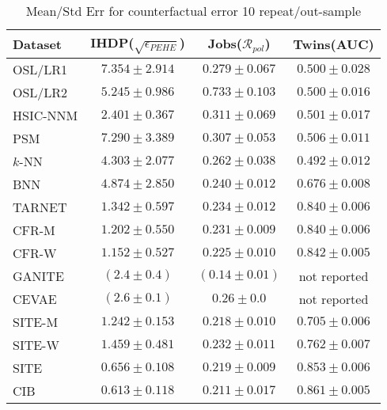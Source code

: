 \documentclass{article}
\begin{document}
\begin{table}[ht]
  \caption{Mean/Std Err for counterfactual error 10 repeat/out-sample}
  \label{metric-out_full}
  \centering
  \begin{tabular}{lccc}
    \toprule
    Dataset & IHDP($\sqrt{\epsilon_{PEHE}}$) & Jobs($\mathcal{R}_{pol}$) & Twins(AUC) \\
    \midrule
    OSL/LR1 & $7.354 \pm 2.914$ & $0.279 \pm 0.067$ & $0.500 \pm 0.028$ \\
    OSL/LR2 & $5.245 \pm 0.986$ & $0.733 \pm 0.103$ & $0.500 \pm 0.016$ \\
    \midrule
    HSIC-NNM & $2.401 \pm 0.367$ & $0.311 \pm 0.069$ & $0.501 \pm 0.017$ \\
    PSM & $7.290 \pm 3.389$ & $0.307 \pm 0.053$ & $0.506 \pm 0.011$ \\
    $k$-NN & $4.303 \pm 2.077$ & $0.262 \pm 0.038$ & $0.492 \pm 0.012$ \\
    \midrule
    BNN & $4.874 \pm 2.850$ & $\mathbf{0.240 \pm 0.012}$ & $0.676 \pm 0.008$ \\
    TARNET & $1.342 \pm 0.597$ & $\mathbf{0.234 \pm 0.012}$ & $0.840 \pm 0.006$ \\
    CFR-M & $1.202 \pm 0.550$ & $\mathbf{0.231 \pm 0.009}$ & $0.840 \pm 0.006$ \\
    CFR-W & $1.152 \pm 0.527$ & $\mathbf{0.225 \pm 0.010}$ & $0.842 \pm 0.005$ \\
    GANITE & $(2.4 \pm 0.4)$ & $({0.14 \pm 0.01})$ & not reported\\
    CEVAE & $(2.6 \pm 0.1)$ & $ 0.26 \pm 0.0$ & not reported\\
    SITE-M & $1.242 \pm 0.153$ & $\mathbf{0.218 \pm 0.010}$ & $0.705 \pm 0.006$ \\
    SITE-W & $1.459 \pm 0.481$ & $\mathbf{0.232 \pm 0.011}$ & $0.762 \pm 0.007$ \\
    SITE & $\mathbf{0.656 \pm 0.108}$ & $\mathbf{0.219 \pm 0.009}$ & $\mathbf{0.853 \pm 0.006}$\\
    \midrule
    CIB & $\mathbf{0.613 \pm 0.118}$ & $\mathbf{0.211 \pm 0.017}$ & $\mathbf{0.861 \pm 0.005}$ \\
    \bottomrule
\end{tabular}
\end{table} 
\end{document}
